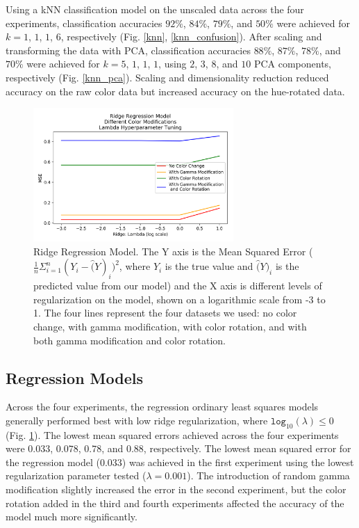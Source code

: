 \documentclass[journal]{IEEEtran}
\begin{document}
Using a kNN classification model on the unscaled data across the four experiments, classification accuracies $92\%$, $84\%$, $79\%$, and $50\%$ were achieved for $k=1$, $1$, $1$, $6$, respectively (Fig. \ref{knn}, \ref{knn_confusion}). After scaling and transforming the data with PCA, classification accuracies $88\%$, $87\%$, $78\%$, and $70\%$ were achieved for $k=5$, $1$, $1$, $1$, using $2$, $3$, $8$, and $10$ PCA components, respectively (Fig. \ref{knn_pca}). Scaling and dimensionality reduction reduced accuracy on the raw color data but increased accuracy on the hue-rotated data.

\begin{figure}
\centering
\includegraphics[height=2in]{Ridge/ridge_regression3.png}
\caption{Ridge Regression Model. The Y axis is the Mean Squared Error ($\frac{1}{n} \Sigma_{i=1}^n (Y_i - \hat(Y)_i)^2$, where $Y_i$ is the true value and $\hat(Y)_i$ is the predicted value from our model) and the X axis is different levels of regularization on the model, shown on a logarithmic scale from -3 to 1. The four lines represent the four datasets we used: no color change, with gamma modification, with color rotation, and with both gamma modification and color rotation.}
\label{ridge}
\end{figure}

\subsection{Regression Models}

Across the four experiments, the regression ordinary least squares models generally performed best with low ridge regularization, where $\texttt{log}_{10}(\lambda) \leq 0$  (Fig. \ref{ridge}). The lowest mean squared errors achieved across the four experiments were $0.033$, $0.078$, $0.78$, and $0.88$, respectively. The lowest mean squared error for the regression model ($0.033$) was achieved in the first experiment using the lowest regularization parameter tested ($\lambda = 0.001$). The introduction of random gamma modification slightly increased the error in the second experiment, but the color rotation added in the third and fourth experiments affected the accuracy of the model much more significantly.
\end{document}
